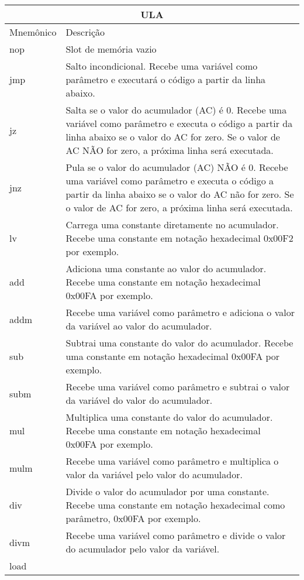 \vspace{1cm}
\begin{longtable}{ |p{3cm}||p{11cm}|  }
  \hline
  \multicolumn{2}{|c|}{ULA} \\
  \hline
  Mnemônico &
  Descrição\\
  \hline
  nop &
  Slot de memória vazio \\
  \hline
  jmp &
  Salto incondicional. Recebe uma variável como parâmetro e executará o código a partir da linha abaixo. \\
  \hline
  jz &
  Salta se o valor do acumulador (AC) é 0. Recebe uma variável como parâmetro e executa o código a partir da linha abaixo se o valor do AC for zero. Se o valor de AC NÃO for zero, a próxima linha será executada. \\
  \hline
  jnz &
  Pula se o valor do acumulador (AC) NÃO é 0. Recebe uma variável como parâmetro e executa o código a partir da linha abaixo se o valor do AC não for zero. Se o valor de AC for zero, a próxima linha será executada. \\
  \hline
  lv &
  Carrega uma constante diretamente no acumulador. Recebe uma constante em notação hexadecimal 0x00F2 por exemplo. \\
  \hline
  add &
  Adiciona uma constante ao valor do acumulador. Recebe uma constante em notação hexadecimal 0x00FA por exemplo. \\
  \hline
  addm &
  Recebe uma variável como parâmetro e adiciona o valor da variável ao valor do acumulador. \\
  \hline
  sub &
  Subtrai uma constante do valor do acumulador. Recebe uma constante em notação hexadecimal 0x00FA por exemplo. \\
  \hline
  subm &
  Recebe uma variável como parâmetro e subtrai o valor da variável do valor do acumulador. \\
  \hline
  mul &
  Multiplica uma constante do valor do acumulador. Recebe uma constante em notação hexadecimal 0x00FA por exemplo. \\
  \hline
  mulm &
  Recebe uma variável como parâmetro e multiplica o valor da variável pelo valor do acumulador. \\
  \hline
  div &
  Divide o valor do acumulador por uma constante. Recebe uma constante em notação hexadecimal como parâmetro, 0x00FA por exemplo. \\
  \hline
  divm &
  Recebe uma variável como parâmetro e divide o valor do acumulador pelo valor da variável. \\
  \hline
  load &

\end{longtable}
